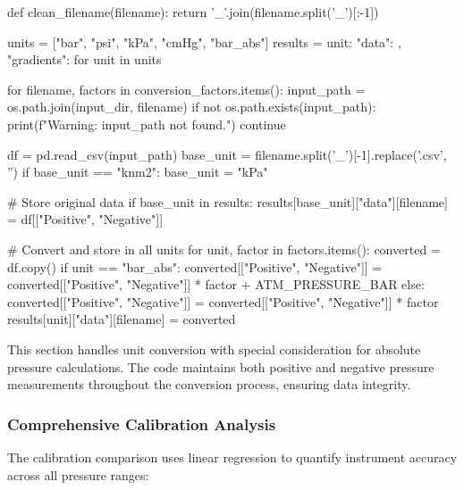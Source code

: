 \documentclass{article}
\begin{document}
\begin{python}
def clean_filename(filename):
    return '_'.join(filename.split('_')[:-1])

units = ["bar", "psi", "kPa", "cmHg", "bar_abs"]
results = {unit: {"data": {}, "gradients": {}} for unit in units}

for filename, factors in conversion_factors.items():
    input_path = os.path.join(input_dir, filename)
    if not os.path.exists(input_path):
        print(f"Warning: {input_path} not found.")
        continue
        
    df = pd.read_csv(input_path)
    base_unit = filename.split('_')[-1].replace('.csv', '')
    if base_unit == "knm2":
        base_unit = "kPa"
    
    # Store original data
    if base_unit in results:
        results[base_unit]["data"][filename] = df[["Positive", "Negative"]]
    
    # Convert and store in all units
    for unit, factor in factors.items():
        converted = df.copy()
        if unit == "bar_abs":
            converted[["Positive", "Negative"]] = converted[["Positive", "Negative"]] * factor + ATM_PRESSURE_BAR
        else:
            converted[["Positive", "Negative"]] = converted[["Positive", "Negative"]] * factor
        results[unit]["data"][filename] = converted
\end{python}

This section handles unit conversion with special consideration for absolute pressure calculations. The code maintains both positive and negative pressure measurements throughout the conversion process, ensuring data integrity.

\subsubsection{Comprehensive Calibration Analysis}
The calibration comparison uses linear regression to quantify instrument accuracy across all pressure ranges:
\end{document}
